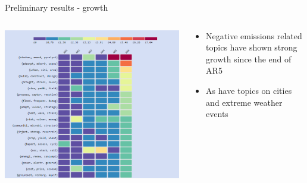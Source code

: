 \documentclass[9pt]{beamer}
\begin{document}
\begin{frame}{Preliminary results - growth}

\begin{columns}
	\begin{column}{0.6\linewidth}
		\begin{center}
			\includegraphics[width=\linewidth]{../plots/top_20_372.png}
		\end{center}
	\end{column}
	\begin{column}{0.4\linewidth}
		\begin{center}
			\begin{itemize}
				\item Negative emissions related topics have shown strong growth since the end of AR5
				\item As have topics on cities and extreme weather events
			\end{itemize}
		\end{center}
	\end{column}
\end{columns}

\end{frame}
\end{document}
